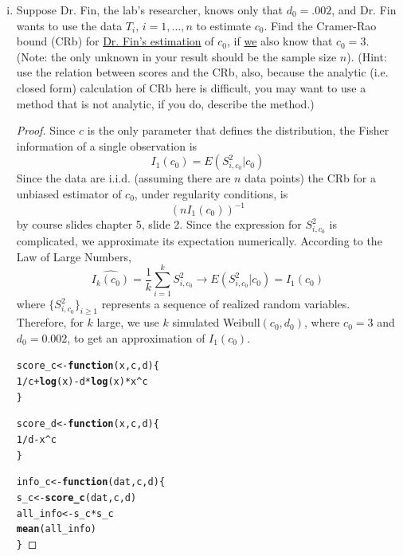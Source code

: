 \documentclass[letterpaper, 12pt]{article}\usepackage[]{graphicx}\usepackage[]{color}
\makeatletter
\newcommand{\hlnum}[1]{\textcolor[rgb]{0.686,0.059,0.569}{#1}}%
\newcommand{\hlopt}[1]{\textcolor[rgb]{0,0,0}{#1}}%
\newcommand{\hlstd}[1]{\textcolor[rgb]{0.345,0.345,0.345}{#1}}%
\newcommand{\hlkwa}[1]{\textcolor[rgb]{0.161,0.373,0.58}{\textbf{#1}}}%
\newcommand{\hlkwb}[1]{\textcolor[rgb]{0.69,0.353,0.396}{#1}}%
\newcommand{\hlkwc}[1]{\textcolor[rgb]{0.333,0.667,0.333}{#1}}%
\newcommand{\hlkwd}[1]{\textcolor[rgb]{0.737,0.353,0.396}{\textbf{#1}}}%
\newenvironment{kframe}{%
 \def\at@end@of@kframe{}%
 \ifinner\ifhmode%
  \def\at@end@of@kframe{\end{minipage}}%
  \begin{minipage}{\columnwidth}%
 \fi\fi%
 \def\FrameCommand##1{\hskip\@totalleftmargin \hskip-\fboxsep
 \colorbox{shadecolor}{##1}\hskip-\fboxsep
     \hskip-\linewidth \hskip-\@totalleftmargin \hskip\columnwidth}%
 \MakeFramed {\advance\hsize-\width
   \@totalleftmargin\z@ \linewidth\hsize
   \@setminipage}}%
 {\par\unskip\endMakeFramed%
 \at@end@of@kframe}
\newenvironment{knitrout}{}{} %
\makeatother
\begin{document}
\begin{enumerate}[(i)]
\item
Suppose Dr. Fin, the lab’s researcher, knows only that $d_0 = .002$, and Dr. Fin wants to use the data $T_i$,
$i = 1, \dots, n$ to estimate $c_0$. Find the Cramer-Rao bound (CRb) for \underline{Dr. Fin’s estimation} of $c_0$, if \underline{we} also
know that $c_0 = 3$. (Note: the only unknown in your result should be the sample size $n$). (Hint: use the
relation between scores and the CRb, also, because the analytic (i.e. closed form) calculation of CRb
here is difficult, you may want to use a method that is not analytic, if you do, describe the method.)

\begin{proof}
Since $c$ is the only parameter that defines the distribution, the Fisher information of a single observation is
\[
I_1(c_0) = E(S_{i,c_0}^2 | c_0)
\]
Since the data are i.i.d. (assuming there are $n$ data points) the CRb for a unbiased estimator of $c_0$, under regularity conditions, is
\[
(nI_1(c_0))^{-1}
\]
by course slides chapter 5, slide 2.
Since the expression for $S_{i,c_0}^2$ is complicated, we approximate its expectation numerically. According to the Law of Large Numbers, 
\[
\widehat{I_k(c_0)} = 
\frac{1}{k} \sum_{i=1}^k S_{i,c_0}^2 \to E(S_{i,c_0}^2 | c_0) = I_1(c_0)
\]
where $\{S_{i,c_0}^2\}_{i \geq 1}$ represents a sequence of realized random variables. 
Therefore, for $k$ large, we use $k$ simulated Weibull$(c_0,d_0)$, where $c_0 = 3$ and $d_0 = 0.002$, to get an approximation of $I_1(c_0)$.

\begin{knitrout}
\color{fgcolor}\begin{kframe}
\begin{alltt}
\hlstd{score_c} \hlkwb{<-} \hlkwa{function}\hlstd{(}\hlkwc{x}\hlstd{,} \hlkwc{c}\hlstd{,} \hlkwc{d}\hlstd{) \{}
    \hlnum{1}\hlopt{/}\hlstd{c} \hlopt{+} \hlkwd{log}\hlstd{(x)} \hlopt{-} \hlstd{d} \hlopt{*} \hlkwd{log}\hlstd{(x)} \hlopt{*} \hlstd{x}\hlopt{^}\hlstd{c}
\hlstd{\}}

\hlstd{score_d} \hlkwb{<-} \hlkwa{function}\hlstd{(}\hlkwc{x}\hlstd{,} \hlkwc{c}\hlstd{,} \hlkwc{d}\hlstd{) \{}
    \hlnum{1}\hlopt{/}\hlstd{d} \hlopt{-} \hlstd{x}\hlopt{^}\hlstd{c}
\hlstd{\}}

\hlstd{info_c} \hlkwb{<-} \hlkwa{function}\hlstd{(}\hlkwc{dat}\hlstd{,} \hlkwc{c}\hlstd{,} \hlkwc{d}\hlstd{) \{}
    \hlstd{s_c} \hlkwb{<-} \hlkwd{score_c}\hlstd{(dat, c, d)}
    \hlstd{all_info} \hlkwb{<-} \hlstd{s_c} \hlopt{*} \hlstd{s_c}
    \hlkwd{mean}\hlstd{(all_info)}
\hlstd{\}}


\end{alltt}
\end{kframe}
\end{knitrout}
\end{proof}
\end{enumerate}
\end{document}
